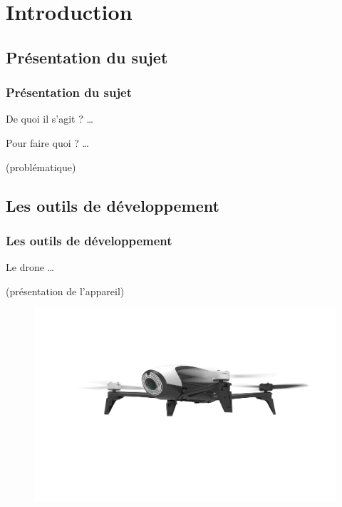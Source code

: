 \section{Introduction}
\subsection{Présentation du sujet}
\begin{frame}
\frametitle{Présentation du sujet}
\begin{center}
De quoi il s'agit ? \dots
\end{center}
\end{frame}

\begin{frame}
\begin{center}
Pour faire quoi ? \dots

(problématique)
\end{center}
\end{frame}

\subsection{Les outils de développement}
\begin{frame}
\frametitle{Les outils de développement}
\begin{center}
Le drone \dots

(présentation de l'appareil)
\begin{figure}
\includegraphics[scale=0.02]{images/drone.jpg}
\end{figure}
\end{center}
\end{frame}

